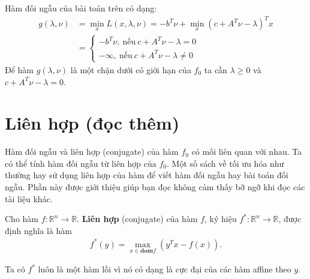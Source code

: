 \documentclass{book}
\begin{document}
Hàm đối ngẫu của bài toán trên có dạng: 
\begin{align*}
g(\lambda, \nu) &= \min_x L(x, \lambda, \nu) = -b^T \nu + \min_x(c + A^T \nu - \lambda)^T x \\
		& = \begin{cases} -b^T \nu, ~ \textrm{nếu} ~ c + A^T \nu - \lambda = 0 \\ -\infty , ~ \textrm{nếu} ~ c + A^T \nu - \lambda \neq 0 \end{cases}
\end{align*}
Để hàm $g(\lambda, \nu)$ là một chặn dưới có giới hạn của $f_0$ ta cần $\lambda \geq 0$ và $c + A^T \nu - \lambda = 0$.


\section{Liên hợp (đọc thêm)}
Hàm đối ngẫu và liên hợp (conjugate) của hàm $f_0$ có mối liên quan với nhau. Ta có thể tính hàm đối ngẫu từ liên hợp của $f_0$. 
Một số sách về tối ưu hóa như \cite{boyd} thường hay sử dụng liên hợp của hàm để viết hàm đối ngẫu hay bài toán đối ngẫu. Phần này được giới thiệu giúp bạn đọc không cảm thấy bỡ ngỡ khi đọc các tài liệu khác.

Cho hàm $f: \mathbb{R}^n \rightarrow \mathbb{R}$. \textbf{Liên hợp} (conjugate) của hàm $f$, ký hiệu $f^*: \mathbb{R}^n \rightarrow \mathbb{R}$, được định nghĩa là hàm
\begin{align*}
f^*(y) = \max_{x \in \mathbf{dom} f} (y^Tx - f(x)).
\end{align*}

Ta có $f^*$ luôn là một hàm lồi vì nó có dạng là cực đại của các hàm affine theo $y$.
\end{document}
